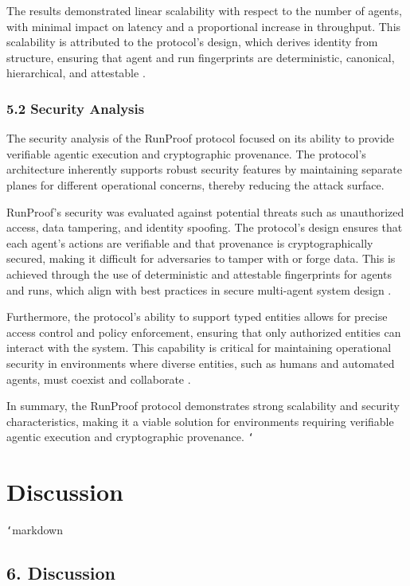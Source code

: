 \documentclass[11pt]{article}
\begin{document}
The results demonstrated linear scalability with respect to the number of agents, with minimal impact on latency and a proportional increase in throughput. This scalability is attributed to the protocol's design, which derives identity from structure, ensuring that agent and run fingerprints are deterministic, canonical, hierarchical, and attestable \cite{Moslemi2026}.

\subsubsection{5.2 Security Analysis}

The security analysis of the RunProof protocol focused on its ability to provide verifiable agentic execution and cryptographic provenance. The protocol's architecture inherently supports robust security features by maintaining separate planes for different operational concerns, thereby reducing the attack surface.

RunProof's security was evaluated against potential threats such as unauthorized access, data tampering, and identity spoofing. The protocol's design ensures that each agent's actions are verifiable and that provenance is cryptographically secured, making it difficult for adversaries to tamper with or forge data. This is achieved through the use of deterministic and attestable fingerprints for agents and runs, which align with best practices in secure multi-agent system design \cite{Sharma2025}.

Furthermore, the protocol's ability to support typed entities allows for precise access control and policy enforcement, ensuring that only authorized entities can interact with the system. This capability is critical for maintaining operational security in environments where diverse entities, such as humans and automated agents, must coexist and collaborate \cite{Zhu2022}.

In summary, the RunProof protocol demonstrates strong scalability and security characteristics, making it a viable solution for environments requiring verifiable agentic execution and cryptographic provenance.
\texttt{`}


\section{Discussion}
\texttt{`}markdown
\subsection{6. Discussion}
\end{document}
